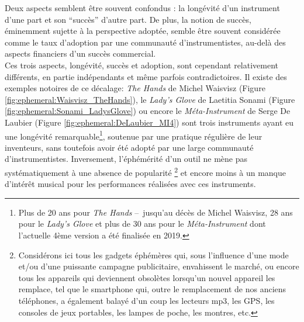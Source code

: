 \noindent Deux aspects semblent être souvent confondus : la longévité d'un instrument d'une part et son ``succès'' d'autre part. De plus, la notion de succès, éminemment sujette à la perspective adoptée, semble être souvent considérée comme le taux d'adoption par une communauté d'instrumentistes, au-delà des aspects financiers d'un succès commercial.\\
\indent Ces trois aspects, longévité, succès et adoption, sont cependant relativement différents, en partie indépendants et même parfois contradictoires. Il existe des exemples notoires de ce décalage: \textit{The Hands} de Michel Waisvisz \cite{torre_hands:_2016} (Figure \ref{fig:ephemeral:Waisvisz_TheHands}), le \textit{Lady's Glove} de Laetitia Sonami \cite{sonami_my_2006} (Figure \ref{fig:ephemeral:Sonami_LadysGlove}) ou encore le \textit{Méta-Instrument} de Serge De Laubier \cite{couprie_meta-instrument:_2018} (Figure \ref{fig:ephemeral:DeLaubier_MI4}) sont trois instruments ayant eu une longévité remarquable\footnote{Plus de 20 ans pour \textit{The Hands} --~jusqu'au décès de Michel Waisvisz, 28 ans pour le \textit{Lady's Glove} et plus de 30 ans pour le \textit{Méta-Instrument} dont l'actuelle 4ème version a été finalisée en 2019.}, soutenue par une pratique régulière de leur inventeurs, sans toutefois avoir été adopté par une large communauté d'instrumentistes. Inversement, l'éphémérité d'un outil ne mène pas systématiquement à une absence de popularité \footnote{Considérons ici tous les gadgets éphémères qui, sous l'influence d'une mode et/ou d'une puissante campagne publicitaire, envahissent le marché, ou encore tous les appareils qui deviennent obsolètes lorsqu'un nouvel appareil les remplace, tel que le smartphone qui, outre le remplacement de nos anciens téléphones, a également balayé d'un coup les lecteurs mp3, les GPS, les consoles de jeux portables, les lampes de poche, les montres, etc.} et encore moins à un manque d'intérêt musical pour les performances réalisées avec ces instruments.\\
